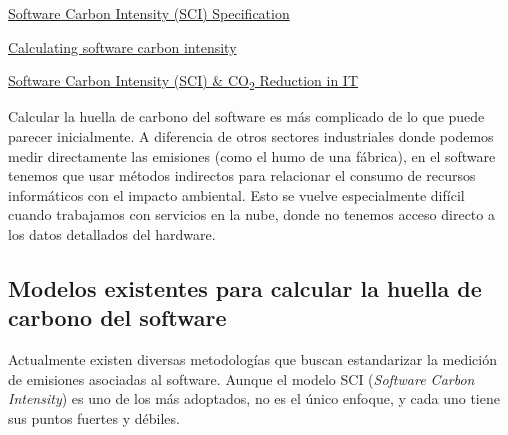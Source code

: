 \documentclass[12pt,a4paper]{report}
\begin{document}
\href{https://sci.greensoftware.foundation/}{Software Carbon Intensity (SCI) Specification}

\href{https://www.thoughtworks.com/insights/blog/ethical-tech/calculating-software-carbon-intensity}{Calculating software carbon intensity}

\href{https://tecnovy.com/en/software-carbon-intensity}{Software Carbon Intensity (SCI) \& CO\textsubscript{2} Reduction in IT}

Calcular la huella de carbono del software es más complicado de lo que puede parecer inicialmente. A diferencia de otros sectores industriales donde podemos medir directamente las emisiones (como el humo de una fábrica), en el software tenemos que usar métodos indirectos para relacionar el consumo de recursos informáticos con el impacto ambiental. Esto se vuelve especialmente difícil cuando trabajamos con servicios en la nube, donde no tenemos acceso directo a los datos detallados del hardware.

\subsection*{Modelos existentes para calcular la huella de carbono del software}

Actualmente existen diversas metodologías que buscan estandarizar la medición de emisiones asociadas al software. Aunque el modelo SCI (\textit{Software Carbon Intensity}) es uno de los más adoptados, no es el único enfoque, y cada uno tiene sus puntos fuertes y débiles.
\end{document}
